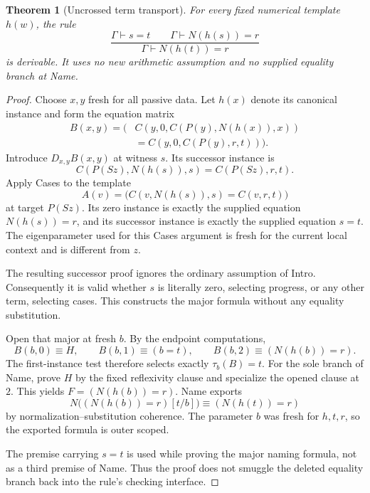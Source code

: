 \documentclass[11pt,a4paper]{article}
\newtheorem{theorem}{Theorem}[section]
\theoremstyle{definition}\newtheorem{definition}[theorem]{Definition}
\theoremstyle{remark}\newtheorem{remark}[theorem]{Remark}
\begin{document}
\begin{theorem}[Uncrossed term transport]
\label{thm:det-transport}
For every fixed numerical template $h(w)$, the rule
\[
 \frac{\Gamma\vdash s=t\qquad\Gamma\vdash N(h(s))=r}
      {\Gamma\vdash N(h(t))=r}
\]
is derivable. It uses no new arithmetic assumption and no supplied
equality branch at Name.
\end{theorem}
\begin{proof}
Choose $x,y$ fresh for all passive data. Let $h(x)$ denote its canonical
instance and form the equation matrix
\[
 \begin{split}
 B(x,y)=\bigl(&C(y,0,C(P(y),N(h(x)),x))\\
             &{}=C(y,0,C(P(y),r,t))\bigr).
 \end{split}
 \tag{Naming matrix}\label{eq:det-naming-matrix}
\]
Introduce $D_{x,y}B(x,y)$ at witness $s$. Its successor instance is
\[
 C(P(Sz),N(h(s)),s)=C(P(Sz),r,t).
\]
Apply Cases to the template
\[
       A(v)=\bigl(C(v,N(h(s)),s)=C(v,r,t)\bigr)
\]
at target $P(Sz)$. Its zero instance is exactly the supplied equation
$N(h(s))=r$, and its successor instance is exactly the supplied equation
$s=t$. The eigenparameter used for this Cases argument is fresh for the
current local context and is different from $z$.

The resulting successor proof ignores the ordinary assumption of Intro.
Consequently it is valid whether $s$ is literally zero, selecting progress,
or any other term, selecting cases. This constructs the major formula
without any equality substitution.

Open that major at fresh $b$. By the endpoint computations,
\[
 B(b,0)\equiv H,\qquad B(b,1)\equiv(b=t),
 \qquad B(b,2)\equiv(N(h(b))=r).
\]
The first-instance test therefore selects exactly $\tau_b(B)=t$.
For the sole branch of Name, prove $H$ by the fixed reflexivity clause
and specialize the opened clause at $2$. This yields
$F=(N(h(b))=r)$. Name exports
\[
 N\bigl((N(h(b))=r)[t/b]\bigr)
       \equiv (N(h(t))=r)
\]
by normalization--substitution coherence. The parameter $b$ was fresh
for $h,t,r$, so the exported formula is outer scoped.

The premise carrying $s=t$ is used while proving the major naming formula,
not as a third premise of Name. Thus the proof does not smuggle the deleted
equality branch back into the rule's checking interface.
\end{proof}
\end{document}
